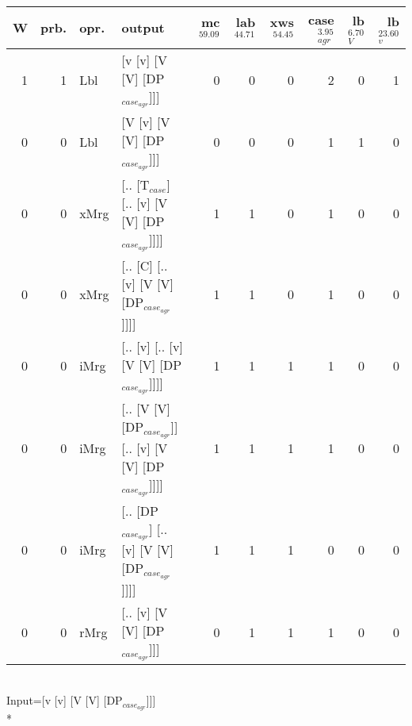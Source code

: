 \begin{tabularx}{\linewidth}{rrlXrrrrrr}
\hline
   W &   prb. & opr.   & output                                                    &   mc$^{59.09}$ &   lab$^{44.71}$ &   xws$^{54.45}$ &   case$_{agr}^{3.95}$ &   lb$_{V}^{6.70}$ &   lb$_{v}^{23.60}$ \\
\hline
   1 &   1 & Lbl  & [v [v] [V [V] [DP$_{case_{agr}}$]]]                             &            0 &             0 &             0 &                  2 &              0 &              1 \\
   0 &   0 & Lbl  & [V [v] [V [V] [DP$_{case_{agr}}$]]]                             &            0 &             0 &             0 &                  1 &              1 &              0 \\
   0 &   0 & xMrg & [.. [T$_{case}$] [.. [v] [V [V] [DP$_{case_{agr}}$]]]]              &            1 &             1 &             0 &                  1 &              0 &              0 \\
   0 &   0 & xMrg & [.. [C] [.. [v] [V [V] [DP$_{case_{agr}}$]]]]                   &            1 &             1 &             0 &                  1 &              0 &              0 \\
   0 &   0 & iMrg & [.. [v] [.. [v] [V [V] [DP$_{case_{agr}}$]]]]                   &            1 &             1 &             1 &                  1 &              0 &              0 \\
   0 &   0 & iMrg & [.. [V [V] [DP$_{case_{agr}}$]] [.. [v] [V [V] [DP$_{case_{agr}}$]]]] &            1 &             1 &             1 &                  1 &              0 &              0 \\
   0 &   0 & iMrg & [.. [DP$_{case_{agr}}$] [.. [v] [V [V] [DP$_{case_{agr}}$]]]]         &            1 &             1 &             1 &                  0 &              0 &              0 \\
   0 &   0 & rMrg & [.. [v] [V [V] [DP$_{case_{agr}}$]]]                            &            0 &             1 &             1 &                  1 &              0 &              0 \\
\hline
\end{tabularx}\endgroup\\
\begingroup\scriptsize Input=[v [v] [V [V] [DP$_{case_{agr}}$]]]\\*

